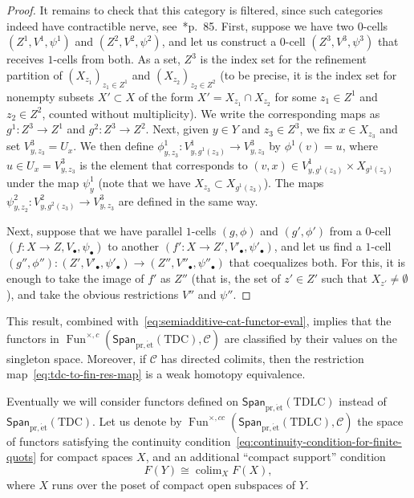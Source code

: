 \documentclass[a4paper,reqno]{amsart}
\theoremstyle{plain}
\theoremstyle{definition}
\theoremstyle{remark}
\numberwithin{equation}{section}
\newcommand{\cC}{\mathcal{C}}
\newcommand{\Span}{\mathsf{Span}}
\newcommand{\pret}{\mathrm{pr,\acute{e}t}}
\newcommand{\TDLC}{\mathrm{TDLC}}
\newcommand{\TDC}{\mathrm{TDC}}
\DeclareMathOperator{\Fun}{Fun}
\DeclareMathOperator*{\colim}{colim}
\begin{document}
\begin{proof}
It remains to check that this category is filtered, since such categories indeed have contractible nerve, see~\cite{MR0338129}*{p.~85}.
First, suppose we have two $0$-cells $(Z^1, V^1, \psi^1)$ and $(Z^2, V^2, \psi^2)$, and let us construct a $0$-cell $(Z^3, V^3, \psi^3)$ that receives $1$-cells from both.
As a set, $Z^3$ is the index set for the refinement partition of $(X_{z_1})_{z_1 \in Z^1}$ and $(X_{z_2})_{z_2 \in Z^2}$ (to be precise, it is the index set for nonempty subsets $X' \subset X$ of the form $X' = X_{z_1} \cap X_{z_2}$ for some $z_1 \in Z^1$ and $z_2 \in Z^2$, counted without multiplicity).
We write the corresponding maps as $g^1 \colon Z^3 \to Z^1$ and $g^2 \colon Z^3 \to Z^2$.
Next, given $y \in Y$ and $z_3 \in Z^3$, we fix $x \in X_{z_3}$ and set $V^3_{y, z_3} = U_x$.
We then define $\phi^1_{y, z_3} \colon V^1_{y, g^1(z_3)} \to V^3_{y, z_3}$ by $\phi^1(v) = u$, where $u \in U_x = V^3_{y, z_3}$ is the element that corresponds to $(v, x) \in V^1_{y, g^1(z_3)} \times X_{g^1(z_3)}$ under the map $\psi^1_y$ (note that we have $X_{z_3} \subset X_{g^1(z_3)}$).
The maps $\psi^2_{y, z_2} \colon V^2_{y, g^2(z_3)} \to V^3_{y, z_3}$ are defined
in the same way.

Next, suppose that we have parallel $1$-cells $(g, \phi)$ and $(g', \phi')$ from a $0$-cell $(f\colon X \to Z, V_{\bullet}, \psi_\bullet)$ to another $(f'\colon X \to Z', V'_\bullet, \psi'_\bullet)$, and let us find a $1$-cell $(g'', \phi'') \colon (Z', V'_\bullet, \psi'_\bullet) \to (Z'', V''_\bullet, \psi''_\bullet)$ that coequalizes both.
For this, it is enough to take the image of $f'$ as $Z''$ (that is, the set of $z' \in Z'$ such that $X_{z'} \neq \emptyset$), and take the obvious restrictions $V''$ and $\psi''$.
\end{proof}

This result, combined with~\eqref{eq:semiadditive-cat-functor-eval}, implies that the functors in $\Fun^{\times,c}(\Span_{\pret}(\TDC), \cC)$ are classified by their values on the singleton space.
Moreover, if $\cC$ has directed colimits, then the restriction map~\eqref{eq:tdc-to-fin-res-map} is a weak homotopy equivalence.

Eventually we will consider functors defined on $\Span_{\pret}(\TDLC)$ instead of $\Span_{\pret}(\TDC)$.
Let us denote by $\Fun^{\times,cc}(\Span_{\pret}(\TDLC), \cC)$ the space of functors satisfying the continuity condition~\eqref{eq:continuity-condition-for-finite-quots} for compact spaces $X$, and an additional ``compact support'' condition
\begin{equation}\label{eq:cpt-supp-as-colim}
F(Y) \cong \colim_{X} F(X),
\end{equation}
where $X$ runs over the poset of compact open subspaces of $Y$.
\end{document}
